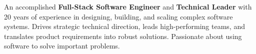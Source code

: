 
An accomplished \textbf{Full-Stack Software Engineer} and \textbf{Technical Leader} with 20 years of experience in designing, building, and scaling complex software systems. Drives strategic technical direction, leads high-performing teams, and translates product requirements into robust solutions. Passionate about using software to solve important problems.

